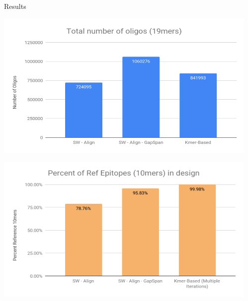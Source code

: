 \documentclass[final]{beamer}
\newlength{\sepwidth}
\newlength{\colwidth}
\newcommand{\separatorcolumn}{\begin{column}{\sepwidth}\end{column}}
\begin{document}
\begin{frame}[t]
\begin{columns}[t]
\begin{column}{\colwidth}
  \begin{block}{Results}
    \begin{minipage}[t]{0.5\colwidth}
        \includegraphics[width=0.5\colwidth,height=15\baselineskip]{figures/total_num_oligos.png}
    \end{minipage}%
    \begin{minipage}[t]{0.5\colwidth}
      \includegraphics[width=0.5\colwidth,height=15\baselineskip]{figures/percent_ref_epis.png}
    \end{minipage}
  \end{block}


\end{column}

\separatorcolumn
\end{columns}
\end{frame}
\end{document}
